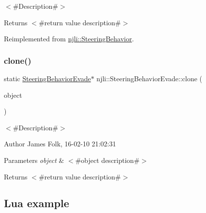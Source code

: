 $<$\#\+Description\#$>$

\begin{DoxyReturn}{Returns}
$<$\#return value description\#$>$ 
\end{DoxyReturn}


Reimplemented from \mbox{\hyperlink{classnjli_1_1_steering_behavior_abbc461d853c1b225cfde5b79d96d11bd}{njli\+::\+Steering\+Behavior}}.

\mbox{\label{classnjli_1_1_steering_behavior_evade_ac1d3de65ea7d4d54de69587ca9bd46f5}} 
\subsubsection{\texorpdfstring{clone()}{clone()}}
{\footnotesize\ttfamily static \mbox{\hyperlink{classnjli_1_1_steering_behavior_evade}{Steering\+Behavior\+Evade}}$\ast$ njli\+::\+Steering\+Behavior\+Evade\+::clone (\begin{DoxyParamCaption}\item[{const \mbox{\hyperlink{classnjli_1_1_steering_behavior_evade}{Steering\+Behavior\+Evade}} \&}]{object }\end{DoxyParamCaption})\hspace{0.3cm}{\ttfamily [static]}}



$<$\#\+Description\#$>$ 

\begin{DoxyAuthor}{Author}
James Folk, 16-\/02-\/10 21\+:02\+:31
\end{DoxyAuthor}

\begin{DoxyParams}{Parameters}
{\em object} & $<$\#object description\#$>$\\
\hline
\end{DoxyParams}
\begin{DoxyReturn}{Returns}
$<$\#return value description\#$>$
\end{DoxyReturn}
\hypertarget{classnjli_1_1_steering_behavior_wander_ex1}{}\subsection{Lua example}\label{classnjli_1_1_steering_behavior_wander_ex1}

